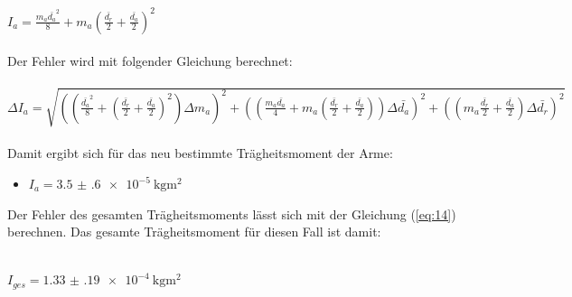 $I_a = \frac{m_a \bar{d_a}^2}{8} + m_a \left( \frac{\bar{d_r}}{2} + \frac{\bar{d_a}}{2} \right)^2$\\\\

Der Fehler wird mit folgender Gleichung berechnet:\\\\

$\Delta I_a = \sqrt{\left(\left( \frac{\bar{d_a}^2}{8} + \left( \frac{\bar{d_r}}{2} +
 \frac{\bar{d_a}}{2} \right)^2\right)  \Delta m_a \right)^2
  + \left(\left( \frac{m_a \bar{d_a}}{4} + m_a \left( \frac{\bar{d_r}}{2} +
  \frac{\bar{d_a}}{2} \right)\right)  \Delta \bar{d_a} \right)^2
  + \left( \left( m_a \frac{\bar{d_r}}{2} + \frac{\bar{d_a}}{2} \right)  \Delta \bar{d_r} \right)^2}$\\\\

Damit ergibt sich für das neu bestimmte Trägheitsmoment der Arme:

\begin{itemize}
  \item $I_a = \SI{3.5(6)e-5}{\kilo\gram\meter\squared}$
\end{itemize}

Der Fehler des gesamten Trägheitsmoments lässt sich mit der Gleichung (\ref{eq:14}) berechnen.
Das gesamte Trägheitsmoment für diesen Fall ist damit:\\\\

\centerline{$I_{ges} = \SI{1.33(19)e-4}{\kilo\gram\meter\squared}$}
